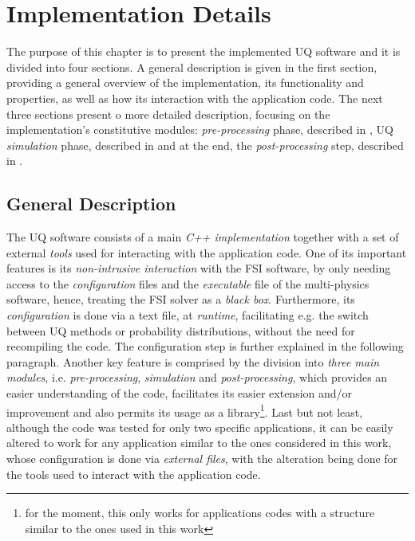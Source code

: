 \chapter{Implementation Details}
\label{chapter:Implementation Details}
	The purpose of this chapter is to present the implemented UQ software and it is divided into four sections. A general description is given in the first section, providing a general overview of the implementation, its functionality and properties, as well as how its interaction with the application code. The next three sections present o more detailed description, focusing on the implementation's constitutive modules: \emph{pre-processing} phase, described in , UQ \emph{simulation} phase, described in  and at the end, the \emph{post-processing} step, described in .
\section{General Description}
\label{sec:General Description}
	The UQ software consists of a main \emph{C++ implementation} together with a set of external \emph{tools} used for interacting with the application code. One of its important features is its \emph{non-intrusive interaction} with the FSI software, by only needing access to the \emph{configuration} files and the \emph{executable} file of the multi-physics software, hence, treating the FSI solver as a \emph{black box}. Furthermore, its \emph{configuration} is done via a text file, at \emph{runtime}, facilitating e.g. the switch between UQ methods or probability distributions, without the need for recompiling the code. The configuration step is further explained in the following paragraph. Another key feature is comprised by the division into \emph{three main modules}, i.e. \emph{pre-processing}, \emph{simulation} and \emph{post-processing}, which  provides an easier understanding of the code, facilitates its easier extension and/or improvement and also permits its usage as a library\footnote{for the moment, this only works for applications codes with a structure similar to the ones used in this work}. Last but not least, although the code was tested for only two specific applications, it can be easily altered to work for any application similar to the ones considered in this work, whose configuration is done via \emph{external files}, with the alteration being done for the tools used to interact with the application code.
	

